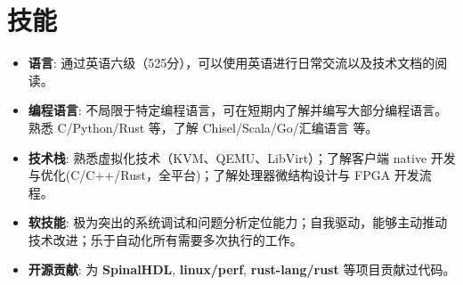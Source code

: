 \documentclass{resume}
\begin{document}
\section{技能}
\begin{itemize}[parsep=0.25ex]
      \item \textbf{语言}:
                  通过英语六级（525分），可以使用英语进行日常交流以及技术文档的阅读。
      \item \textbf{编程语言}:
                  不局限于特定编程语言，可在短期内了解并编写大部分编程语言。
                  熟悉 C/Python/Rust 等，了解 Chisel/Scala/Go/汇编语言 等。
      \item \textbf{技术栈}:
                  熟悉虚拟化技术（KVM、QEMU、LibVirt）；了解客户端 native 开发与优化(C/C++/Rust，全平台)；了解处理器微结构设计与 FPGA 开发流程。
      \item \textbf{软技能}:
                  极为突出的系统调试和问题分析定位能力；自我驱动，能够主动推动技术改进；乐于自动化所有需要多次执行的工作。
      \item \textbf{开源贡献}:
                  为 \textbf{SpinalHDL}, \textbf{linux/perf}, \textbf{rust-lang/rust} 等项目贡献过代码。
\end{itemize}
\end{document}
